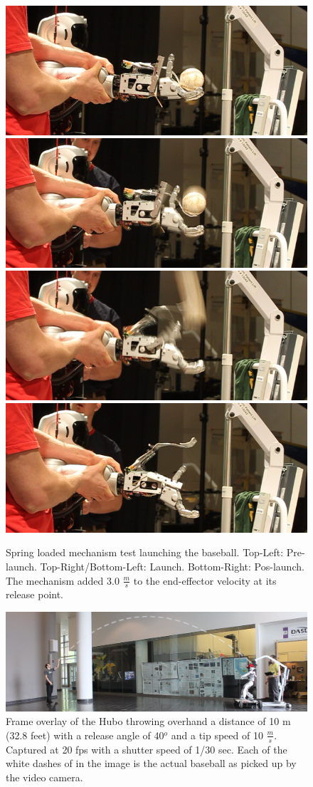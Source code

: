 \begin{figure}[t]
  \centering
\includegraphics[width=0.4\columnwidth]{./pix/arm0.png}\includegraphics[width=0.4\columnwidth]{./pix/arm1.png}
\includegraphics[width=0.4\columnwidth]{./pix/arm2.png}\includegraphics[width=0.4\columnwidth]{./pix/arm3.png}
  \caption{Spring loaded mechanism test launching the baseball.  Top-Left: Pre-launch.  Top-Right/Bottom-Left: Launch.  Bottom-Right: Pos-launch.  The mechanism added 3.0 $\frac{m}{s}$ to the end-effector velocity at its release point.}
  \label{fig:hubo-spring}
\end{figure}

\begin{figure}[t]
  \centering
\includegraphics[width=1.0\textwidth]{./pix/preThrow2.png}
  \caption{Frame overlay of the Hubo throwing overhand a distance of 10 m (32.8 feet) with a release angle of 40$^o$ and a tip speed of 10 $\frac{m}{s}$.  Captured at 20 fps with a shutter speed of 1/30 sec.  Each of the white dashes of in the image is the actual baseball as picked up by the video camera.}
  \label{fig:hubo-throw-test}
\end{figure}

